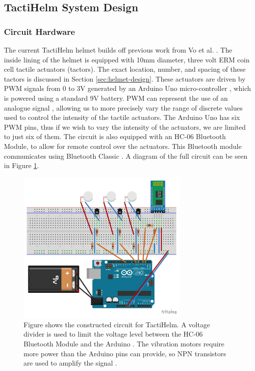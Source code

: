 \documentclass{mpaper}
\begin{document}
\subsection{TactiHelm System Design}\label{sec:system-design}
\subsubsection{Circuit Hardware}\label{sec:circuit-design}
The current TactiHelm helmet builds off previous work from Vo et al. \cite{10.1145/3411763.3451580}. The inside lining of the helmet is equipped with 10mm diameter, three volt ERM coin cell tactile actuators (tactors). The exact location, number, and spacing of these tactors is discussed in Section \ref{sec:helmet-design}. These actuators are driven by PWM signals from 0 to 3V generated by an Arduino Uno micro-controller \cite{arduinouno}, which is powered using a standard 9V battery. PWM can represent the use of an analogue signal \cite{kart2001pulse}, allowing us to more precisely vary the range of discrete values used to control the intensity of the tactile actuators. The Arduino Uno has six PWM pins, thus if we wish to vary the intensity of the actuators, we are limited to just six of them. The circuit is also equipped with an HC-06 Bluetooth Module, to allow for remote control over the actuators. This Bluetooth module communicates using Bluetooth Classic \cite{hc06}. A diagram of the full circuit can be seen in Figure \ref{fig:circuit}.

\begin{figure}[ht]
    \centering
    \includegraphics[width=0.75\textwidth]{images/circuit-design_bb.pdf}
    \caption{Figure shows the constructed circuit for TactiHelm. A voltage divider is used to limit the voltage level between the HC-06 Bluetooth Module and the Arduino \cite{bluetoothmodule}. The vibration motors require more power than the Arduino pins can provide, so NPN transistors are used to amplify the signal \cite{vibrationmotor}.}
    \label{fig:circuit}
\end{figure}
\end{document}
